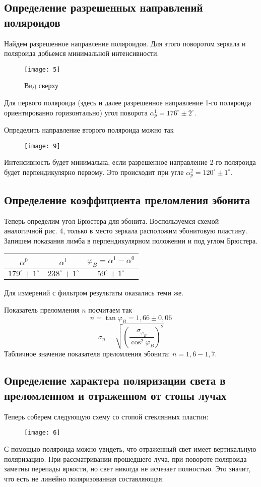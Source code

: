 	\subsection{Определение разрешенных направлений поляроидов}
Найдем разрешенное направление поляроидов. Для этого поворотом зеркала и поляроида добьемся минимальной интенсивности.

\begin{figure}[H]
	\centering
	\texttt{[image: 5]}
	\caption{Вид сверху}
\end{figure}
Для первого поляроида (здесь и далее разрешенное направление 1-го поляроида ориентированно горизонтально) угол поворота $\alpha_p^1 = 176^\circ\pm2^\circ$.

Определить направление второго поляроида можно так 
\begin{figure}[H]
	\centering
	\texttt{[image: 9]}
\end{figure}
Интенсивность будет минимальна, если разрешенное направление 2-го поляроида будет перпендикулярно первому. Это происходит при угле $\alpha_p^2=120^\circ\pm1^\circ$.

	\subsection{Определение коэффициента преломления эбонита}
Теперь определим угол Брюстера для эбонита. Воспользуемся схемой аналогичной рис. 4, только в место зеркала расположим эбонитовую пластину. Запишем показания лимба в перпендикулярном положении и под углом Брюстера.
\begin{table}[H]
	\centering
	\begin{tabular}{|c|c|c|}
		\hline
		$\alpha^0$            & $\alpha^1$            & $\varphi_B = \alpha^1-\alpha^0$ \\ \hline
		$179^\circ\pm1^\circ$ & $238^\circ\pm1^\circ$ & $59^\circ\pm1^\circ$            \\ \hline
	\end{tabular}
\end{table}
Для измерений с фильтром результаты оказались теми же.

Показатель преломления $n$ посчитаем так
\[
	n = \tan{\varphi_B} = 1,66\pm0,06
\]
\[
	\sigma_n = \sqrt{\left(\frac{\sigma_{\varphi_B}}{\cos^2{\varphi_B}}\right)^2}
\]
Табличное значение показателя преломления эбонита: $n = 1,6-1,7$.

	\subsection{Определение характера поляризации света в преломленном и отраженном от стопы лучах}
Теперь соберем следующую схему со стопой стеклянных пластин:
\begin{figure}[H]
	\centering
	\texttt{[image: 6]}
\end{figure}
С помощью поляроида можно увидеть, что отраженный свет имеет вертикальную поляризацию. При рассматривании прошедшего луча, при повороте поляроида заметны перепады яркости, но свет никогда не исчезает полностью. Это значит, что есть не линейно поляризованная составляющая.

